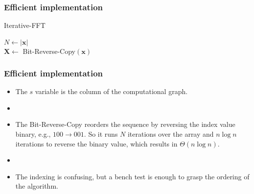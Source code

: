 \documentclass{beamer}
\begin{document}
\begin{frame}
    \frametitle{Efficient implementation}
    \begin{algorithm}[H]
	\caption{Iterative-FFT}
	$N \gets |\bm{x}|$ \\
	$\bm{X} \gets $ Bit-Reverse-Copy$\left( \bm{x} \right) $ \\

    \end{algorithm}
\end{frame}

\begin{frame}
    \frametitle{Efficient implementation}
    \begin{itemize}
	\item The $s$ variable is the column of the computational graph.
	\item 
        \item The Bit-Reverse-Copy reorders the sequence by reversing the index value binary, e.g., $100\to 001$. So it runs $N$ iterations over the array and $n \log n$ iterations to reverse the binary value, which results in $\Theta\left( n \log n \right) $.
	\item 
	\item The indexing is confusing, but a bench test is enough to grasp the ordering of the algorithm.
    \end{itemize}
\end{frame}
\end{document}
